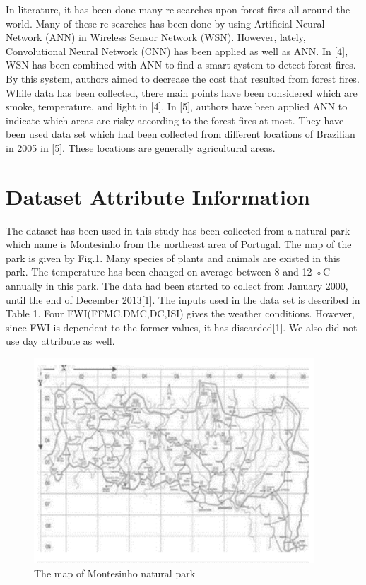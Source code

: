 \documentclass[onecolumn]{article}
\begin{document}
In literature, it has been done many re-searches upon forest fires all around the world. Many of these re-searches has been done by using Artificial Neural Network (ANN) in Wireless Sensor Network (WSN). However, lately, Convolutional Neural Network (CNN) has been applied as well as ANN.
In [4], WSN has been combined with ANN to find a smart system to detect forest fires. By this system, authors aimed to decrease the cost that resulted from forest fires. While data has been collected, there main points have been considered which are smoke, temperature, and light in [4].
In [5], authors have been applied ANN to indicate which areas are risky according to the forest fires at most. They have been used data set which had been collected from different locations of Brazilian in 2005 in [5]. These locations are generally agricultural areas. 


\section{Dataset Attribute Information}
The dataset has been used in this study has been collected from a natural park which name is Montesinho from the northeast area of Portugal. The map of the park is given by Fig.1. Many species of plants and animals are existed in this park. The temperature has been changed on average between 8 and 12 ◦C annually in this park. The data had been started to collect from January 2000, until the end of December 2013[1].
The inputs used in the data set is described in Table 1. Four FWI(FFMC,DMC,DC,ISI) gives the weather conditions. However, since FWI is dependent to the former values, it has discarded[1]. We also did not use day attribute as well.
\begin{figure}[htb!]
\centerline
{\includegraphics[width=105mm,scale=1.0]{fig1.png}}
\caption{The map of Montesinho natural park}
\end{figure}
\end{document}

